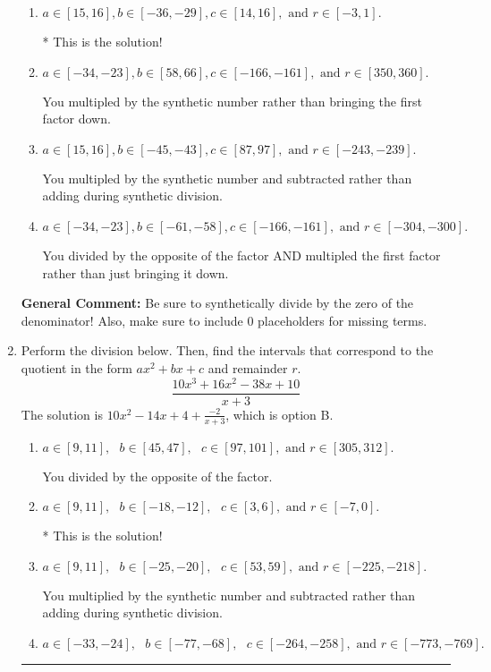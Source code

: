 \documentclass{extbook}[14pt]
\newcommand{\litem}[1]{\item #1

\rule{\textwidth}{0.4pt}}
\begin{document}
\begin{enumerate}
{\begin{enumerate}[label=\Alph*.]
 You divided by the opposite of the factor.
\item \( a \in [15, 16], b \in [-36, -29], c \in [14, 16], \text{ and } r \in [-3, 1]. \)

* This is the solution!
\item \( a \in [-34, -23], b \in [58, 66], c \in [-166, -161], \text{ and } r \in [350, 360]. \)

 You multipled by the synthetic number rather than bringing the first factor down.
\item \( a \in [15, 16], b \in [-45, -43], c \in [87, 97], \text{ and } r \in [-243, -239]. \)

 You multipled by the synthetic number and subtracted rather than adding during synthetic division.
\item \( a \in [-34, -23], b \in [-61, -58], c \in [-166, -161], \text{ and } r \in [-304, -300]. \)

 You divided by the opposite of the factor AND multipled the first factor rather than just bringing it down.
\end{enumerate}

\textbf{General Comment:} Be sure to synthetically divide by the zero of the denominator! Also, make sure to include 0 placeholders for missing terms.
}
\litem{
Perform the division below. Then, find the intervals that correspond to the quotient in the form $ax^2+bx+c$ and remainder $r$.
\[ \frac{10x^{3} +16 x^{2} -38 x + 10}{x + 3} \]The solution is \( 10x^{2} -14 x + 4 + \frac{-2}{x + 3} \), which is option B.\begin{enumerate}[label=\Alph*.]
\item \( a \in [9, 11], \text{   } b \in [45, 47], \text{   } c \in [97, 101], \text{   and   } r \in [305, 312]. \)

 You divided by the opposite of the factor.
\item \( a \in [9, 11], \text{   } b \in [-18, -12], \text{   } c \in [3, 6], \text{   and   } r \in [-7, 0]. \)

* This is the solution!
\item \( a \in [9, 11], \text{   } b \in [-25, -20], \text{   } c \in [53, 59], \text{   and   } r \in [-225, -218]. \)

 You multiplied by the synthetic number and subtracted rather than adding during synthetic division.
\item \( a \in [-33, -24], \text{   } b \in [-77, -68], \text{   } c \in [-264, -258], \text{   and   } r \in [-773, -769]. \)


\end{enumerate}}
\end{enumerate}
\end{document}
